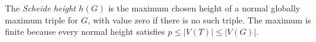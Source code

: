 \begin{definition}
The \emph{Scheide height} $h(G)$ is the maximum chosen height of a normal
globally maximum triple for $G$, with value zero if there is no such
triple.  The maximum is finite because every normal height satisfies
$p\le |V(T)|\le |V(G)|$.
\end{definition}
